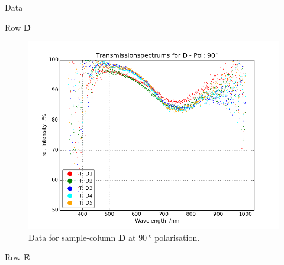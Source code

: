 \begin{appendix}
\begin{chapter}{Data}
\begin{section}{Row \textbf{D}}
\begin{figure}[ht!]
\begin{minipage}{.92\textwidth}
          \includegraphics[width=\textwidth]{Figures/TransspecRAW_DPol90.png}
          \caption{Data for sample-column \textbf{D} at $\SI{90}{\degree}$
              polarisation.}
          \label{fig:TransspecRAW_DPol90}
        \end{minipage}
      \end{figure}
      
    \end{section}
    
    
    
    \newpage
    \begin{section}{Row \textbf{E}}
      \label{Appendix:DataE}
      

\end{section}
\end{chapter}
\end{appendix}
